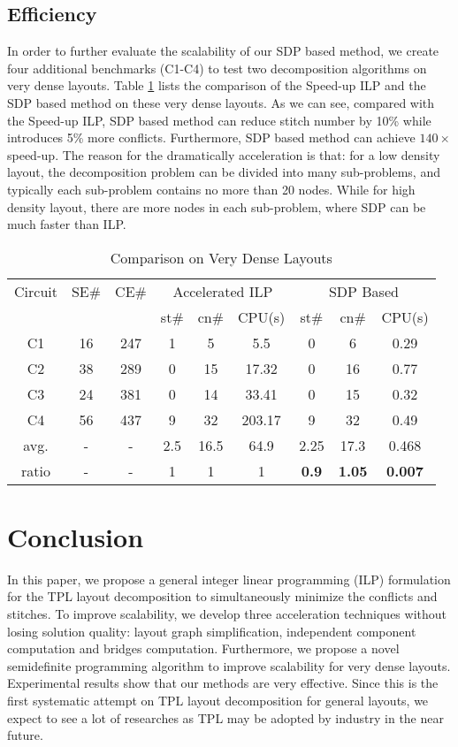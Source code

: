\documentclass[10pt,conference]{IEEEtran}
\begin{document}
\subsection{Efficiency }

In order to further evaluate the scalability of our SDP based method, we create four additional benchmarks (C1-C4) to test two decomposition algorithms on very dense layouts.
Table \ref{tab:result2} lists the comparison of the Speed-up ILP and the SDP based method on these very dense layouts.
As we can see, compared with the Speed-up ILP, SDP based method can reduce stitch number by 10\% while introduces 5\% more conflicts.
Furthermore, SDP based method can achieve $140\times$ speed-up.
The reason for the dramatically acceleration is that: for a low density layout, the decomposition problem can be divided into many sub-problems, and typically each sub-problem contains no more than 20 nodes. While for high density layout, there are more nodes in each sub-problem, where SDP can be much faster than ILP.



\begin{table}[thb]
\centering
\caption{Comparison on Very Dense Layouts}
\label{tab:result2}
\begin{tabular}{|c|c|c|c|c|c|c|c|c|}
	\hline \hline
	Circuit	& SE\#&CE\#	& \multicolumn{3}{|c}{Accelerated ILP}	& \multicolumn{3}{|c|}{SDP Based}\\
	\cline{4-9}
			&	&	& st\#	& cn\#	& CPU(s)		& st\#	& cn\#	& CPU(s)\\
	\hline
	C1	& 16	&247	& 1 	& 5	& 5.5		& 0 & 6	& 0.29	\\
	C2	& 38	&289& 0	& 15	& 17.32	& 0 & 16	& 0.77 	\\
	C3	& 24	&381& 0 	& 14	& 33.41 	& 0 & 15	& 0.32 	\\
	C4	& 56 &437& 9	& 32	& 203.17	& 9 & 32	& 0.49	\\
	\hline
	avg.	& -	& -	& 2.5	&16.5&64.9	& 2.25&17.3&0.468	\\
	ratio	& -	& -	& 1	& 1	& 1		& \textbf{0.9}	& \textbf{1.05} & \textbf{0.007} \\
	\hline \hline
\end{tabular}
\end{table}
 

\section{Conclusion}
\label{chap:conclusion}

In this paper, we propose a general integer linear programming (ILP) formulation for the TPL layout decomposition to simultaneously minimize the conflicts  and stitches.
To improve scalability, we develop three acceleration techniques without losing solution quality:
layout graph simplification, independent component computation and bridges computation. 
Furthermore, we propose a novel semidefinite programming algorithm to improve scalability for very dense layouts.
Experimental results show that our methods are very effective. Since this is the first systematic attempt on TPL layout decomposition for general layouts, we expect to see a lot of researches as TPL may be adopted by industry in the near future.


\vspace{-.1in}


\end{document}

